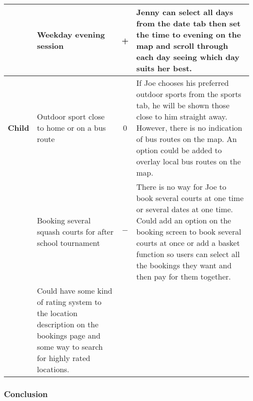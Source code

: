 \begin{center}
\begin{longtable}{p{} p{} c p{}}
		& Weekday evening session & + & Jenny can select all days from the date
		tab then set the time to evening on the map and scroll through each day
		seeing which day suits her best.\\

		\midrule
		\textbf{Child} & Outdoor sport close to home or on a bus route & 0 & If
		Joe chooses his preferred outdoor sports from the sports tab, he will
		be shown those close to him straight away. However, there is no
		indication of bus routes on the map. An option could be added to
		overlay local bus routes on the map.\\

		& Booking several squash courts for after school tournament & $-$ &
		There is no way for Joe to book several courts at one time or several
		dates at one time. Could add an option on the booking screen to book
		several courts at once or add a basket function so users can select all
		the bookings they want and then pay for them together.\\

		& Could have some kind of rating system to the location description on
		the bookings page and some way to search for highly rated locations.\\
		\bottomrule
	\end{longtable}
\end{center}
\restoregeometry%

\subsubsection{Conclusion}

